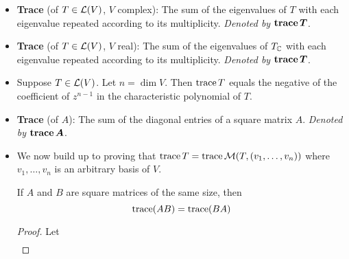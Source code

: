 \documentclass[../main.tex]{subfiles}
\begin{document}
\begin{itemize}
\begin{theorem}
\begin{proof}
\begin{align*}
                \mat{T,(u_1,\dots,u_n)} &= \mat{IT,(u_1,\dots,u_n),(u_1,\dots,u_n)}\\
                &= \mat{I,(v_1,\dots,v_n),(u_1,\dots,u_n)}\mat{T,(u_1,\dots,u_n),(v_1,\dots,v_n)}\tag*{Theorem \ref{trm:matST}}\\
                &= A^{-1}\mat{T,(u_1,\dots,u_n),(v_1,\dots,v_n)}\tag*{Theorem \ref{trm:changeBasisIdentity}}
            \end{align*}
            We also have that
            \begin{align*}
                \mat{T,(u_1,\dots,u_n),(v_1,\dots,v_n)} &= \mat{TI,(u_1,\dots,u_n),(v_1,\dots,u_n)}\\
                &= \mat{T,(v_1,\dots,v_n),(v_1,\dots,v_n)}\mat{I,(u_1,\dots,u_n),(v_1,\dots,v_n)}\tag*{Theorem \ref{trm:matST}}\\
                &= \mat{T,(v_1,\dots,v_n)}A
            \end{align*}
            Substituting the second equation into the first gives the desired results.
        \end{proof}
    \end{theorem}
    \item \textbf{Trace} (of $T\in\mathcal{L}(V)$, $V$ complex): The sum of the eigenvalues of $T$ with each eigenvalue repeated according to its multiplicity. \emph{Denoted by} $\bm{\tra T}$.
    \item \textbf{Trace} (of $T\in\mathcal{L}(V)$, $V$ real): The sum of the eigenvalues of $T_{\mathbb{C}}$ with each eigenvalue repeated according to its multiplicity. \emph{Denoted by} $\bm{\tra T}$.
    \item Suppose $T\in\mathcal{L}(V)$. Let $n=\dim V$. Then $\operatorname{trace} T$ equals the negative of the coefficient of $z^{n-1}$ in the characteristic polynomial of $T$.
    \item \textbf{Trace} (of $A$): The sum of the diagonal entries of a square matrix $A$. \emph{Denoted by} $\bm{\tra A}$.
    \item We now build up to proving that $\operatorname{trace} T=\operatorname{trace}\mathcal{M}(T,(v_1,\dots,v_n))$ where $v_1,\dots,v_n$ is an arbitrary basis of $V$.
    \begin{theorem}\label{trm:traABtraBA}
        If $A$ and $B$ are square matrices of the same size, then
        \begin{equation*}
            \operatorname{trace}(AB) = \operatorname{trace}(BA)
        \end{equation*}
        \begin{proof}
            Let
            \begin{align*}

\end{align*}
\end{proof}
\end{theorem}
\end{itemize}
\end{document}
